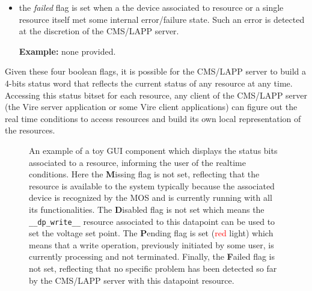\begin{itemize}
\item the  \emph{failed} flag is set  when a the device  associated to
  resource or a single resource itself met some internal error/failure
  state. Such an  error is detected at the discretion  of the CMS/LAPP
  server.

\noindent\textbf{Example:} none provided.




\end{itemize}


\noindent  Given these  four boolean  flags,  it is  possible for  the
CMS/LAPP  server to  build  a  4-bits status  word  that reflects  the
current  status of  any resource  at any  time. Accessing  this status
bitset for each resource, any client  of the CMS/LAPP server (the Vire
server application  or some Vire  client applications) can  figure out
the real time  conditions to access resources and build its own local
representation of the resources.

\begin{figure}[h]
\begin{center}
\scalebox{0.75}{}
\end{center}
\caption{An example of a toy GUI  component which displays the status bits
  associated  to  a  resource,  informing the  user  of  the  realtime
  conditions. Here  the \textbf{M}issing  flag is not  set, reflecting
  that the resource  is available to the system  typically because the
  associated device is recognized by  the MOS and is currently running
  with all its functionalities.  The \textbf{D}isabled flag is not set
  which  means the  \texttt{\_\_dp\_write\_\_} resource  associated to
  this  datapoint can  be  used to  set the  voltage  set point.   The
  \textbf{P}ending  flag  is  set (\textcolor{red}{red}  light)  which
  means that a write operation,  previously initiated by some user, is
  currently   processing    and   not   terminated.     Finally,   the
  \textbf{F}ailed flag is not set, reflecting that no specific problem
  has been detected so far by  the CMS/LAPP server with this datapoint
  resource.}
\label{fig:vire_resource:status_flags_0}
\end{figure}

\vfill
\clearpage
\pagebreak
